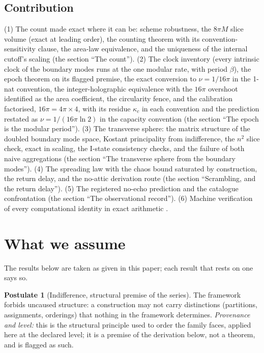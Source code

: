\documentclass[11pt]{article}
\theoremstyle{definition}
\newtheorem{postulate}[theorem]{Postulate}
\theoremstyle{plain}
\begin{document}
\subsection*{Contribution}
\label{c:note.scrambling.setting-contribution}
(1) The count made exact where it can be: scheme robustness, the $8\pi M$ slice volume (exact at leading order), the counting theorem with its convention-sensitivity clause, the area-law equivalence, and the uniqueness of the internal cutoff's scaling (the section ``The count''). (2) The clock inventory (every intrinsic clock of the boundary modes runs at the one modular rate, with period $\beta$), the epoch theorem on its flagged premise, the exact conversion to $\nu = 1/16\pi$ in the 1-nat convention, the integer-holographic equivalence with the $16\pi$ overshoot identified as the area coefficient, the circularity fence, and the calibration factorised, $16\pi = 4\pi \times 4$, with its residue $\kappa_c$ in each convention and the prediction restated as $\nu = 1/(16\pi\ln 2)$ in the capacity convention (the section ``The epoch is the modular period''). (3) The transverse sphere: the matrix structure of the doubled boundary mode space, Kostant principality from indifference, the $n^2$ slice check, exact in scaling, the I-state consistency checks, and the failure of both naive aggregations (the section ``The transverse sphere from the boundary modes''). (4) The spreading law with the chaos bound saturated by construction, the return delay, and the no-attic derivation route (the section ``Scrambling, and the return delay''). (5) The registered no-echo prediction and the catalogue confrontation (the section ``The observational record''). (6) Machine verification of every computational identity in exact arithmetic \cite{ButlerVerifyT8}.

\section*{What we assume}
The results below are taken as given in this paper; each result that rests on one says so.
\begin{postulate}[Indifference, structural premise of the series]\label{c:scrambling.indifference-structural-premise-series}
The framework forbids uncaused structure: a construction may not carry distinctions (partitions, assignments, orderings) that nothing in the framework determines. \emph{Provenance and level:} this is the structural principle used to order the family faces, applied here at the declared level; it is a premise of the derivation below, not a theorem, and is flagged as such.
\end{postulate}
\end{document}
